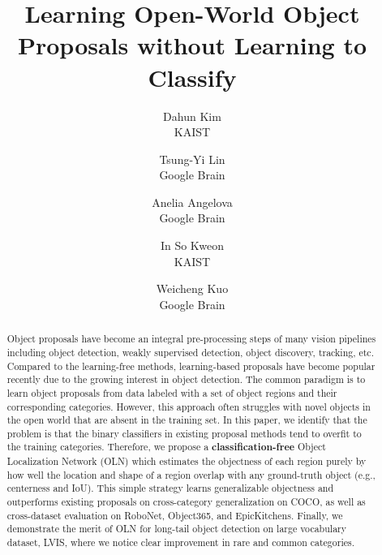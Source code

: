 \documentclass[10pt,twocolumn,letterpaper]{article}
\begin{document}
\title{Learning Open-World Object Proposals without Learning to Classify}

\author{Dahun Kim\\
KAIST\\
\and
Tsung-Yi Lin\\
Google Brain\\

\and
Anelia Angelova\\
Google Brain\\

\and
In So Kweon\\
KAIST\\

\and
Weicheng Kuo\\
Google Brain\\
}

\maketitle
\ificcvfinal\thispagestyle{empty}\fi

\begin{abstract}
Object proposals have become an integral pre-processing steps of many vision pipelines including object detection, weakly supervised detection, object discovery, tracking, etc. Compared to the learning-free methods, learning-based proposals have become popular recently due to the growing interest in object detection. The common paradigm is to learn object proposals from data labeled with a set of object regions and their corresponding categories. However, this approach often struggles with novel objects in the open world that are absent in the training set. In this paper, we identify that the problem is that the binary classifiers in existing proposal methods tend to overfit to the training categories. 
Therefore, we propose a \textbf{classification-free} Object Localization Network (OLN) which estimates the objectness of each region purely by how well the location and shape of a region overlap with any ground-truth object (e.g., centerness and IoU). This simple strategy learns generalizable objectness and outperforms existing proposals on cross-category generalization on COCO, as well as cross-dataset evaluation on RoboNet, Object365, and EpicKitchens. Finally, we demonstrate the merit of OLN for long-tail object detection on large vocabulary dataset, LVIS, where we notice clear improvement in rare and common categories.
\end{abstract}
\end{document}
